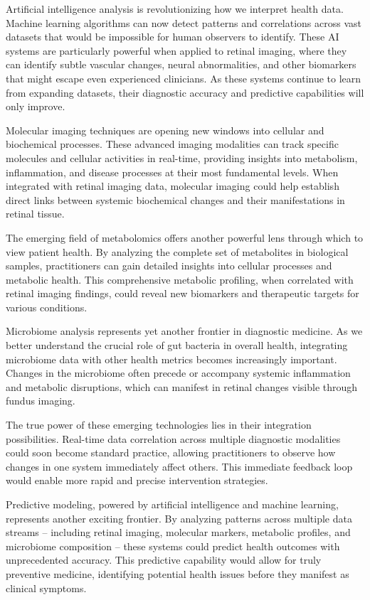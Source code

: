 \documentclass[
  Letterpaper,
]{scrbook}
\begin{document}
Artificial intelligence analysis is revolutionizing how we interpret
health data. Machine learning algorithms can now detect patterns and
correlations across vast datasets that would be impossible for human
observers to identify. These AI systems are particularly powerful when
applied to retinal imaging, where they can identify subtle vascular
changes, neural abnormalities, and other biomarkers that might escape
even experienced clinicians. As these systems continue to learn from
expanding datasets, their diagnostic accuracy and predictive
capabilities will only improve.

Molecular imaging techniques are opening new windows into cellular and
biochemical processes. These advanced imaging modalities can track
specific molecules and cellular activities in real-time, providing
insights into metabolism, inflammation, and disease processes at their
most fundamental levels. When integrated with retinal imaging data,
molecular imaging could help establish direct links between systemic
biochemical changes and their manifestations in retinal tissue.

The emerging field of metabolomics offers another powerful lens through
which to view patient health. By analyzing the complete set of
metabolites in biological samples, practitioners can gain detailed
insights into cellular processes and metabolic health. This
comprehensive metabolic profiling, when correlated with retinal imaging
findings, could reveal new biomarkers and therapeutic targets for
various conditions.

Microbiome analysis represents yet another frontier in diagnostic
medicine. As we better understand the crucial role of gut bacteria in
overall health, integrating microbiome data with other health metrics
becomes increasingly important. Changes in the microbiome often precede
or accompany systemic inflammation and metabolic disruptions, which can
manifest in retinal changes visible through fundus imaging.

The true power of these emerging technologies lies in their integration
possibilities. Real-time data correlation across multiple diagnostic
modalities could soon become standard practice, allowing practitioners
to observe how changes in one system immediately affect others. This
immediate feedback loop would enable more rapid and precise intervention
strategies.

Predictive modeling, powered by artificial intelligence and machine
learning, represents another exciting frontier. By analyzing patterns
across multiple data streams -- including retinal imaging, molecular
markers, metabolic profiles, and microbiome composition -- these systems
could predict health outcomes with unprecedented accuracy. This
predictive capability would allow for truly preventive medicine,
identifying potential health issues before they manifest as clinical
symptoms.
\end{document}

